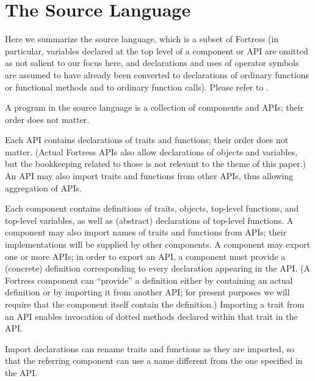\section{The Source Language}

Here we summarize the source language, which is a subset of Fortress (in
particular, variables declared at the top level of a component or API are
omitted as not salient to our focus here, and declarations and uses of operator
symbols are assumed to have already been converted to declarations of ordinary
functions or functional methods and to ordinary function calls).
Please refer to .

A program in the source language is a collection of components and APIs; their order does not matter.

Each API contains declarations of traits and functions; their order does not matter.
(Actual Fortress APIs also allow declarations of objects and variables, but the bookkeeping
related to those is not relevant to the theme of this paper.)
An API may also import traits and functions from other APIs,
thus allowing aggregation of APIs.

Each component contains definitions of traits, objects, top-level functions, and top-level variables,
as well as (abstract) declarations of top-level functions.  A component may also import names of
traits and functions from APIs; their implementations will be supplied by other components.
A component may export one or more APIs; in order to export an API, a component must
provide a (concrete) definition corresponding to every declaration appearing in the API.
(A Fortress component can ``provide'' a definition either by containing an actual definition
or by importing it from another API; for present purposes we will require that the
component itself contain the definition.)  Importing a trait from an API enables invocation of
dotted methods declared within that trait in the API.

Import declarations can rename traits and functions as they are imported, so that the referring component
can use a name different from the one specified in the API.

